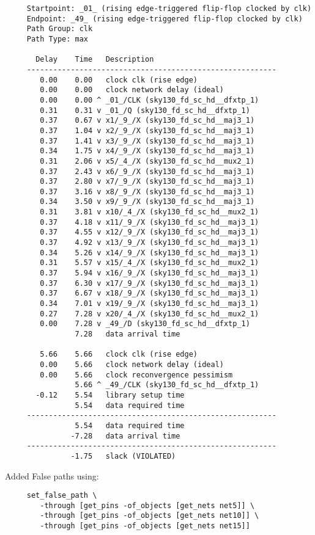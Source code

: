 \documentclass[12pt,a4paper]{article}
\begin{document}
\begin{verbatim}
     Startpoint: _01_ (rising edge-triggered flip-flop clocked by clk)
     Endpoint: _49_ (rising edge-triggered flip-flop clocked by clk)
     Path Group: clk
     Path Type: max
     
       Delay    Time   Description
     ---------------------------------------------------------
        0.00    0.00   clock clk (rise edge)
        0.00    0.00   clock network delay (ideal)
        0.00    0.00 ^ _01_/CLK (sky130_fd_sc_hd__dfxtp_1)
        0.31    0.31 v _01_/Q (sky130_fd_sc_hd__dfxtp_1)
        0.37    0.67 v x1/_9_/X (sky130_fd_sc_hd__maj3_1)
        0.37    1.04 v x2/_9_/X (sky130_fd_sc_hd__maj3_1)
        0.37    1.41 v x3/_9_/X (sky130_fd_sc_hd__maj3_1)
        0.34    1.75 v x4/_9_/X (sky130_fd_sc_hd__maj3_1)
        0.31    2.06 v x5/_4_/X (sky130_fd_sc_hd__mux2_1)
        0.37    2.43 v x6/_9_/X (sky130_fd_sc_hd__maj3_1)
        0.37    2.80 v x7/_9_/X (sky130_fd_sc_hd__maj3_1)
        0.37    3.16 v x8/_9_/X (sky130_fd_sc_hd__maj3_1)
        0.34    3.50 v x9/_9_/X (sky130_fd_sc_hd__maj3_1)
        0.31    3.81 v x10/_4_/X (sky130_fd_sc_hd__mux2_1)
        0.37    4.18 v x11/_9_/X (sky130_fd_sc_hd__maj3_1)
        0.37    4.55 v x12/_9_/X (sky130_fd_sc_hd__maj3_1)
        0.37    4.92 v x13/_9_/X (sky130_fd_sc_hd__maj3_1)
        0.34    5.26 v x14/_9_/X (sky130_fd_sc_hd__maj3_1)
        0.31    5.57 v x15/_4_/X (sky130_fd_sc_hd__mux2_1)
        0.37    5.94 v x16/_9_/X (sky130_fd_sc_hd__maj3_1)
        0.37    6.30 v x17/_9_/X (sky130_fd_sc_hd__maj3_1)
        0.37    6.67 v x18/_9_/X (sky130_fd_sc_hd__maj3_1)
        0.34    7.01 v x19/_9_/X (sky130_fd_sc_hd__maj3_1)
        0.27    7.28 v x20/_4_/X (sky130_fd_sc_hd__mux2_1)
        0.00    7.28 v _49_/D (sky130_fd_sc_hd__dfxtp_1)
                7.28   data arrival time
     
        5.66    5.66   clock clk (rise edge)
        0.00    5.66   clock network delay (ideal)
        0.00    5.66   clock reconvergence pessimism
                5.66 ^ _49_/CLK (sky130_fd_sc_hd__dfxtp_1)
       -0.12    5.54   library setup time
                5.54   data required time
     ---------------------------------------------------------
                5.54   data required time
               -7.28   data arrival time
     ---------------------------------------------------------
               -1.75   slack (VIOLATED)
\end{verbatim}

Added False paths using:
\begin{verbatim}
     set_false_path \
        -through [get_pins -of_objects [get_nets net5]] \
        -through [get_pins -of_objects [get_nets net10]] \
        -through [get_pins -of_objects [get_nets net15]]
\end{verbatim}
\end{document}
